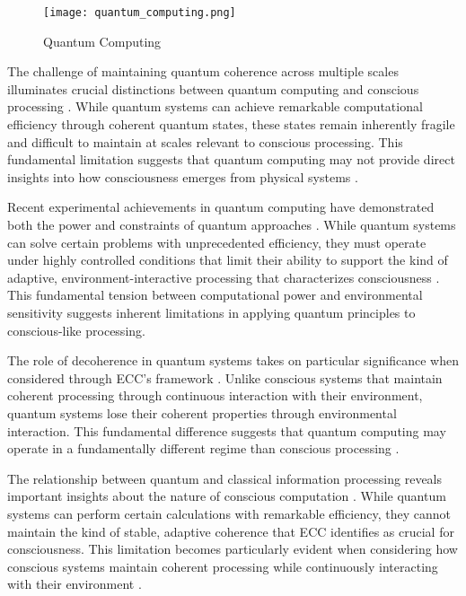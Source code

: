 \begin{refsection}
\begin{figure}[h]
    \centering
    \texttt{[image: quantum\_computing.png]}

    \caption{Quantum Computing}
\end{figure}

The challenge of maintaining quantum coherence across multiple scales illuminates crucial distinctions between quantum computing and conscious processing \cite{Terhal2018}. While quantum systems can achieve remarkable computational efficiency through coherent quantum states, these states remain inherently fragile and difficult to maintain at scales relevant to conscious processing. This fundamental limitation suggests that quantum computing may not provide direct insights into how consciousness emerges from physical systems \cite{Wallraff2021}.

Recent experimental achievements in quantum computing have demonstrated both the power and constraints of quantum approaches \cite{Zhong2020}. While quantum systems can solve certain problems with unprecedented efficiency, they must operate under highly controlled conditions that limit their ability to support the kind of adaptive, environment-interactive processing that characterizes consciousness \cite{Aaronson2021a}. This fundamental tension between computational power and environmental sensitivity suggests inherent limitations in applying quantum principles to conscious-like processing.

The role of decoherence in quantum systems takes on particular significance when considered through ECC's framework \cite{Arute2019}. Unlike conscious systems that maintain coherent processing through continuous interaction with their environment, quantum systems lose their coherent properties through environmental interaction. This fundamental difference suggests that quantum computing may operate in a fundamentally different regime than conscious processing \cite{Bernstein2018}.

The relationship between quantum and classical information processing reveals important insights about the nature of conscious computation \cite{Deutsch2020}. While quantum systems can perform certain calculations with remarkable efficiency, they cannot maintain the kind of stable, adaptive coherence that ECC identifies as crucial for consciousness. This limitation becomes particularly evident when considering how conscious systems maintain coherent processing while continuously interacting with their environment \cite{DiVincenzo2019}.


\end{refsection}
